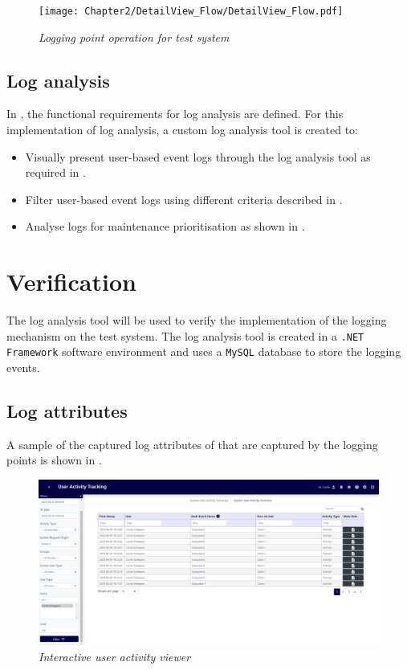 \begin{figure}[!htb]
	\centering %
	\texttt{[image: Chapter2/DetailView\_Flow/DetailView\_Flow.pdf]}
	\caption[Logging point operation for test system]
	{\textit{Logging point operation for test system}}\label{fig:ch3_loggingProcess}
\end{figure}

\clearpage

\subsection{Log analysis}\label{sec:ch3_implementationLogAnalysis}
In , the functional requirements for log analysis are defined. For this implementation of log analysis, a custom log analysis tool is created to:

\begin{itemize}
	\item Visually present user-based event logs through the log analysis tool as required in .
	\item Filter user-based event logs using different criteria described in .
	\item Analyse logs for maintenance prioritisation as shown in .
\end{itemize}

\section{Verification}\label{sec:ch3_Verification}
The log analysis tool will be used to verify the implementation of the logging mechanism on the test system. The log analysis tool is created in a \texttt{.NET Framework} software environment and uses a \texttt{MySQL} database to store the logging events.

\subsection{Log attributes}
A sample of the captured log attributes of  that are captured by the logging points is shown in .

\begin{figure}[!htb]
	\centering %
	\includegraphics[width=0.99\linewidth]{img/ch3/analysis/UAT_menu.png}
	\caption[Interactive user activity viewer]
	{\textit{Interactive user activity viewer}}\label{fig:ch3_UAT_menu}
\end{figure}

